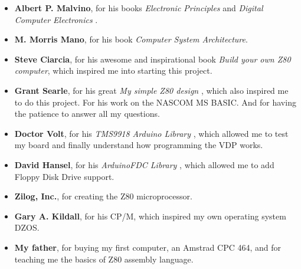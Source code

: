 \documentclass[a4paper,11pt]{article}
\begin{document}
    \begin{itemize}
        \item \textbf{Albert P. Malvino}, for his books \textit{Electronic
        Principles}\cite{malvino1} and \textit{Digital Computer Electronics}
        \cite{malvino2}.
        \item \textbf{M. Morris Mano}, for his book \textit{Computer System
        Architecture}\cite{morrismano1}.
        \item \textbf{Steve Ciarcia}, for his awesome and inspirational book
        \textit{Build your own Z80 computer}\cite{ciarcia1}, which inspired me
        into starting this project.
        \item \textbf{Grant Searle}, for his great \textit{My simple Z80 design}
        \cite{searle1}, which also inspired me to do this project. For his work
        on the NASCOM MS BASIC. And for having the patience to answer all my
        questions.
        \item \textbf{Doctor Volt}, for his \textit{TMS9918 Arduino Library}
        \cite{drvolt}, which allowed me to test my board and finally
        understand how programming the VDP works.
        \item \textbf{David Hansel}, for his \textit{ArduinoFDC Library}
        \cite{dhansel}, which allowed me to add Floppy Disk Drive support.
        \item \textbf{Zilog, Inc.}, for creating the Z80 microprocessor.
        \item \textbf{Gary A. Kildall}, for his CP/M, which inspired my own
        operating system DZOS.
        \item \textbf{My father}, for buying my first computer, an Amstrad CPC
        464, and for teaching me the basics of Z80 assembly language.
    \end{itemize}




    \pagebreak
    
    
\end{document}
